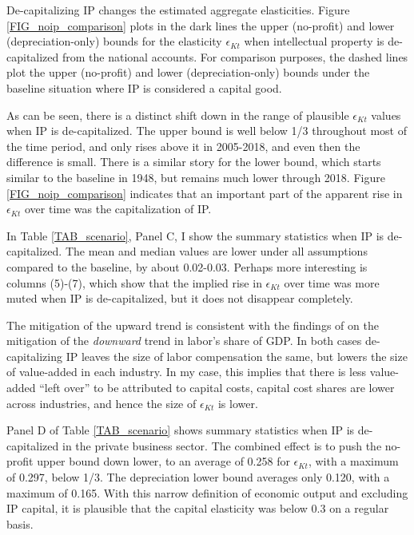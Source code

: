\documentclass[11pt]{article}
\begin{document}
De-capitalizing IP changes the estimated aggregate elasticities. Figure \ref{FIG_noip_comparison} plots in the dark lines the upper (no-profit) and lower (depreciation-only) bounds for the elasticity $\epsilon_{Kt}$ when intellectual property is de-capitalized from the national accounts. For comparison purposes, the dashed lines plot the upper (no-profit) and lower (depreciation-only) bounds under the baseline situation where IP is considered a capital good. 

As can be seen, there is a distinct shift down in the range of plausible $\epsilon_{Kt}$ values when IP is de-capitalized. The upper bound is well below 1/3 throughout most of the time period, and only rises above it in 2005-2018, and even then the difference is small. There is a similar story for the lower bound, which starts similar to the baseline in 1948, but remains much lower through 2018. Figure \ref{FIG_noip_comparison} indicates that an important part of the apparent rise in $\epsilon_{Kt}$ over time was the capitalization of IP. 

In Table \ref{TAB_scenario}, Panel C, I show the summary statistics when IP is de-capitalized. The mean and median values are lower under all assumptions compared to the baseline, by about 0.02-0.03. Perhaps more interesting is columns (5)-(7), which show that the implied rise in $\epsilon_{Kt}$ over time was more muted when IP is de-capitalized, but it does not disappear completely. 

The mitigation of the upward trend is consistent with the findings of \cite{ksz2020} on the mitigation of the \textit{downward} trend in labor's share of GDP. In both cases de-capitalizing IP leaves the size of labor compensation the same, but lowers the size of value-added in each industry. In my case, this implies that there is less value-added ``left over'' to be attributed to capital costs, capital cost shares are lower across industries, and hence the size of $\epsilon_{Kt}$ is lower. 

Panel D of Table \ref{TAB_scenario} shows summary statistics when IP is de-capitalized in the private business sector. The combined effect is to push the no-profit upper bound down lower, to an average of 0.258 for $\epsilon_{Kt}$, with a maximum of 0.297, below 1/3. The depreciation lower bound averages only 0.120, with a maximum of 0.165. With this narrow definition of economic output and excluding IP capital, it is plausible that the capital elasticity was below 0.3 on a regular basis.
\end{document}
